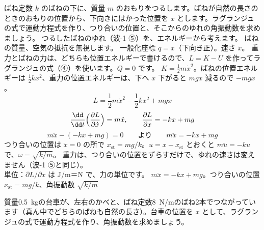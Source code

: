 \label{ph:波-3:ex2}
\begin{phreidai}
ばね定数 $k$ のばねの下に、質量 $m$ のおもりをつるします。ばねが自然の長さのときのおもりの位置から、下向きにはかった位置を $x$ とします。ラグランジュの式で運動方程式を作り、つり合いの位置と、そこからのゆれの角振動数を求めましょう。
\phbamen
つるしたばねのゆれ（波-1 ⑤）を、エネルギーから考えます。
\phmushi
ばねの質量、空気の抵抗を無視します。
\phzu
一般化座標 $q=x$（下向き正）。速さ $\dot x$。
\phriyu
重力とばねの力は、どちらも位置エネルギーで書けるので、$L=K-U$ を作ってラグランジュの式（④）を使います。$Q=0$ です。
\phtateru
$K=\tfrac12m\dot x^2$。ばねの位置エネルギーは $\tfrac12kx^2$、重力の位置エネルギーは、下へ $x$ 下がると $mgx$ 減るので $-mgx$。
\[L=\frac12m\dot x^2-\frac12kx^2+mgx\]
\phtoku
\[\frac{\dd}{\dd t}\Bigl(\frac{\partial L}{\partial\dot x}\Bigr)=m\ddot x,\qquad\frac{\partial L}{\partial x}=-kx+mg\]
\[m\ddot x-(-kx+mg)=0\qquad\text{より}\qquad m\ddot x=-kx+mg\]
つり合いの位置は $\ddot x=0$ の所で $x_{\mathrm{st}}=mg/k$。$u=x-x_{\mathrm{st}}$ とおくと $m\ddot u=-ku$ で、$\omega=\sqrt{k/m}$。
\phtashikame
重力は、つり合いの位置をずらすだけで、ゆれの速さは変えません（波-1 ⑤と同じ）。\\
単位：$\partial L/\partial x$ は J/m＝N で、力の単位です。
\kotae $m\ddot x=-kx+mg$。つり合いの位置 $x_{\mathrm{st}}=mg/k$、角振動数 $\sqrt{k/m}$
\end{phreidai}
\begin{jibun}
質量\qty{0.5}{kg}の台車が、左右のかべと、ばね定数\qty{8}{N/m}のばね2本でつながっています（真ん中でどちらのばねも自然の長さ）。台車の位置を $x$ として、ラグランジュの式で運動方程式を作り、角振動数を求めましょう。
\end{jibun}

